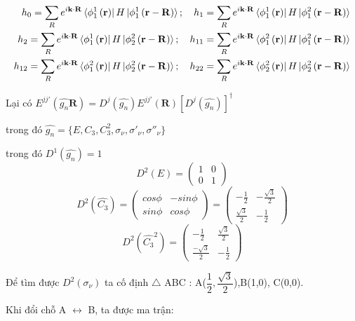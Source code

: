 \documentclass{report}
\begin{document}
\begin{align*}
	h_0 = \sum_{R} e^{i\mathbf{k\cdot R}} \bra*{\phi_1^1 \left(\mathbf{r}\right)} H \ket*{\phi_1^1\left(\mathbf{r}-\mathbf{R}\right)}; \quad h_1 = \sum_{R} e^{i\mathbf{k\cdot R}} \bra*{\phi_1^1 \left(\mathbf{r}\right)} H \ket*{\phi_1^2\left(\mathbf{r}-\mathbf{R}\right)}     \\
	h_2 = \sum_{R} e^{i\mathbf{k\cdot R}} \bra*{\phi_1^1 \left(\mathbf{r}\right)} H \ket*{\phi_2^2\left(\mathbf{r}-\mathbf{R}\right)}; \quad  h_{11} = \sum_{R} e^{i\mathbf{k\cdot R}} \bra*{\phi_1^2 \left(\mathbf{r}\right)} H \ket*{\phi_1^2\left(\mathbf{r}-\mathbf{R}\right)} \\
	h_{12} = \sum_{R} e^{i\mathbf{k\cdot R}} \bra*{\phi_1^2 \left(\mathbf{r}\right)} H \ket*{\phi_2^2\left(\mathbf{r}-\mathbf{R}\right)}; \quad h_{22} = \sum_{R} e^{i\mathbf{k\cdot R}} \bra*{\phi_2^2 \left(\mathbf{r}\right)} H \ket*{\phi_2^2\left(\mathbf{r}-\mathbf{R}\right)}
\end{align*}

Lại có $E^{jj'} \left(\hat{g_n}\textbf{R}\right)= D^j(\hat{g_n}) E^{jj'}
	\left(\textbf{R}\right)\left[D^j(\hat{g_n})\right]^{\dagger}$

trong đó $\hat{g_n} = \{E,C_3,C^2_3,\sigma_\nu,\sigma'_\nu,\sigma''_\nu\}$

trong đó $D^1(\hat{g_n}) = 1$
\[
	\renewcommand{\arraystretch}{0.75}
	D^2(E) = \begin{pmatrix}
		1 & 0 \\
		0 & 1
	\end{pmatrix}
\]
\[
	\renewcommand{\arraystretch}{0.75}
	D^2(\hat{C_3}) = \begin{pmatrix}
		cos\phi & -sin\phi \\
		sin\phi & cos\phi
	\end{pmatrix}
	= \begin{pmatrix}
		-\frac{1}{2}       & -\frac{\sqrt{3}}{2} \\
		\frac{\sqrt{3}}{2} & -\frac{1}{2}
	\end{pmatrix}
\]
\[
	\renewcommand{\arraystretch}{0.75}
	D^2(\hat{C_3}^2) =
	\begin{pmatrix}
		-\frac{1}{2}        & \frac{\sqrt{3}}{2} \\
		\frac{-\sqrt{3}}{2} & -\frac{1}{2}
	\end{pmatrix}
\]

Để tìm được $D^2(\sigma_\nu)$ ta cố định $\bigtriangleup$ ABC : A($\dfrac{1}{2},\dfrac{\sqrt{3}}{2}$),B(1,0), C(0,0).

Khi đổi chỗ A $\leftrightarrow$ B, ta được ma trận:
\end{document}
